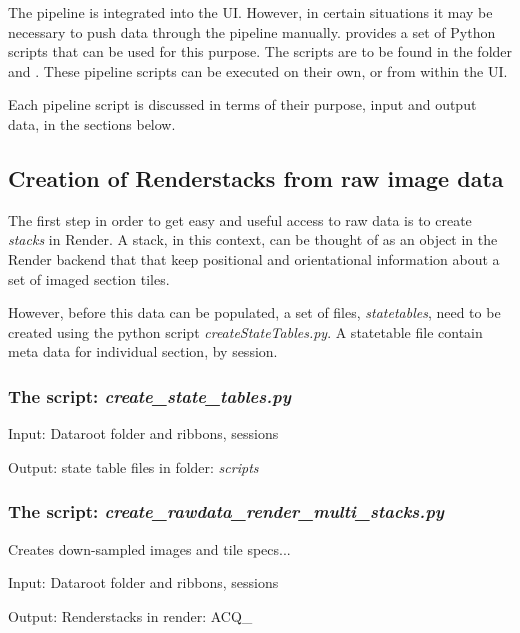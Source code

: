 The pipeline is integrated into the \ate UI. However, in certain situations it may be necessary to push data through the pipeline manually. \ate provides a set of 
Python scripts that can be used for this purpose. The scripts are to be found in the folder  and . These pipeline scripts can be executed on their own, or from within the UI.

Each pipeline script is discussed in terms of their purpose, input and output data, in the sections below.

\subsection{Creation of Renderstacks from raw image data}
The first step in order to get easy and useful access to raw data is to create \emph{stacks} in Render. A stack, in this context, can be thought of as an object in the Render backend that that keep positional and orientational information about a set of imaged section tiles. 

However, before this data can be populated, a set of files, \emph{statetables}, need to be created using the python script \emph{createStateTables.py}. 
A statetable file contain meta data for individual section, by session.

\subsubsection{The script: \emph{create\_state\_tables.py}}
\singlespacing

\lstset{basicstyle=\tiny,style=mypython}


Input: Dataroot folder and ribbons, sessions

Output: state table files in folder: \emph{scripts} 

\subsubsection{The script: \emph{create\_rawdata\_render\_multi\_stacks.py}}
Creates down-sampled images and tile specs...

\singlespacing
{} 

Input: Dataroot folder and ribbons, sessions

Output: Renderstacks in render: ACQ\_ 

